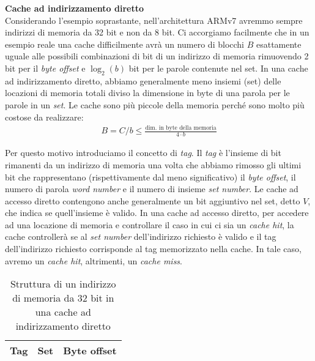 \begin{defn}
    \textbf{Cache ad indirizzamento diretto} \\
    Considerando l'esempio soprastante, nell'architettura ARMv7 avremmo sempre
    indirizzi di memoria da 32 bit e non da 8 bit. Ci accorgiamo facilmente che
    in un esempio reale una cache difficilmente avrà un numero di blocchi $B$
    esattamente uguale alle possibili combinazioni di bit di un indirizzo di
    memoria rimuovendo 2 bit per il \textit{byte offset} e $\log_2(b)$ bit per
    le parole contenute nel set. In una cache ad indirizzamento diretto, abbiamo
    generalmente meno insiemi (set) delle locazioni di memoria totali diviso la
    dimensione in byte di una parola per le parole in un \textit{set}. Le cache
    sono più piccole della memoria perché sono molto più costose da realizzare:
    \begin{equation*}
        \begin{aligned}
            B = C/b \leq \frac{\text{dim. in byte della memoria}}{4 \cdot b}
        \end{aligned}
    \end{equation*}

    Per questo motivo introduciamo il concetto di \textit{tag}. Il \textit{tag}
    è l'insieme di bit rimanenti da un indirizzo di memoria una volta che
    abbiamo rimosso gli ultimi bit che rappresentano (rispettivamente dal meno
    significativo) il \textit{byte offset}, il numero di parola \textit{word
    number} e il numero di insieme \textit{set number}. Le cache ad accesso
    diretto contengono anche generalmente un bit aggiuntivo nel set, detto $V$,
    che indica se quell'insieme è valido. In una cache ad accesso diretto, per
    accedere ad una locazione di memoria e controllare il caso in cui ci sia un
    \textit{cache hit}, la cache controllerà se al \textit{set number}
    dell'indirizzo richiesto è valido e il tag dell'indirizzo richiesto
    corrisponde al tag memorizzato nella cache. In tale caso, avremo un
    \textit{cache hit}, altrimenti, un \textit{cache miss}.

    \begin{table}[]
        \centering
        \caption{Struttura di un indirizzo di memoria da 32 bit in una cache ad indirizzamento diretto}
        \label{tab:addr-direct}
        \begin{tabular}{|l|l|l|}
        \hline
        Tag & Set & Byte offset \\ \hline
        \end{tabular}
        \end{table}
\end{defn}

